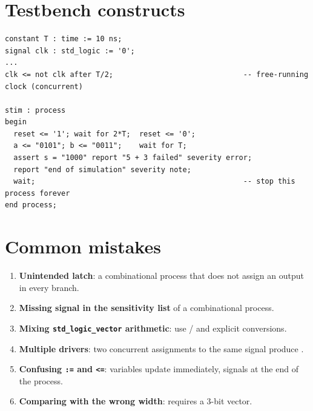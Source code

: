 \section{Testbench constructs}
\begin{lstlisting}[caption={Clock generation, stimulus and a self-checking assertion.},label={lst:a-tb}]
constant T : time := 10 ns;
signal clk : std_logic := '0';
...
clk <= not clk after T/2;                              -- free-running clock (concurrent)

stim : process
begin
  reset <= '1'; wait for 2*T;  reset <= '0';
  a <= "0101"; b <= "0011";    wait for T;
  assert s = "1000" report "5 + 3 failed" severity error;
  report "end of simulation" severity note;
  wait;                                                -- stop this process forever
end process;
\end{lstlisting}

\section{Common mistakes}
\begin{enumerate}
  \item \textbf{Unintended latch}: a combinational process that does not assign an output in every branch.
  \item \textbf{Missing signal in the sensitivity list} of a combinational process.
  \item \textbf{Mixing \texttt{std\_logic\_vector} arithmetic}: use / and explicit conversions.
  \item \textbf{Multiple drivers}: two concurrent assignments to the same  signal produce .
  \item \textbf{Confusing \texttt{:=} and \texttt{<=}}: variables update immediately, signals at the end of the process.
  \item \textbf{Comparing with the wrong width}:  requires a 3-bit vector.
\end{enumerate}
